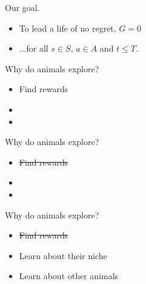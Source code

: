 \documentclass[10pt]{beamer}
\begin{document}
\begin{frame}[fragile]{Our goal.}
\begin{itemize}
    \item To lead a life of no regret, $G=0$
    \item ...for all $s \in S$, $a \in A$ and $t \leq T$.
\end{itemize}
\end{frame}

\begin{frame}[fragile]{Why do animals explore?}
\begin{itemize}
    \item Find rewards
    \item 
    \item
\end{itemize}
\end{frame}

\begin{frame}[fragile]{Why do animals explore?}
\begin{itemize}
    \item \st{Find rewards}
    \item 
    \item
\end{itemize}
\end{frame}

\begin{frame}[fragile]{Why do animals explore?}
\begin{itemize}
    \item \st{Find rewards}
    \item Learn about their niche
    \item Learn about other animals
\end{itemize}
\end{frame}
\end{document}
